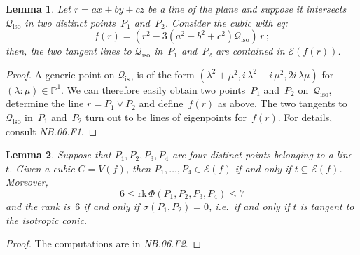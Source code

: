 \documentclass[a4paper, 11pt, reqno]{amsart}
\theoremstyle{plain}
\newtheorem{lemma}{Lemma}[section]
\theoremstyle{definition}
\newcommand{\p}{\mathbb{P}}
\newcommand{\nb}[2]{\textsl{{NB}.{#1}.{#2}}}
\newcommand{\iii}{\textit{i}\,}
\newcommand{\rk}{\ensuremath{\mathrm{rk}}}
\newcommand{\iso}{\mathcal{Q}_{\mathrm{iso}}}
\newcommand{\Eig}[1]{\mathcal{E}\!\left( {#1} \right)}
\begin{document}
\begin{lemma}
\label{lemma:twoTangentsCiso} Let $r = ax+by+cz$ be a line of the plane
and suppose it intersects $\iso$ in two
distinct points~$P_1$ and~$P_2$. Consider the cubic with eq:
\begin{equation}
\label{eq:2_lines_of_eigenpoints}
  f(r) = \left( r^2-3\left(a^2+b^2+c^2\right)\iso \right) \, r \,;
\end{equation}
then, the two tangent lines to $\iso$ in~$P_1$ and~$P_2$
are contained in $\Eig {f(r)}$.
\end{lemma}
\begin{proof}
A generic point on $\iso$ is of the form $(\lambda^2 + \mu^2,
\iii\lambda^2 -\iii\mu^2, 2\iii\lambda \mu)$ for $(\lambda: \mu) \in \p^1$.
We can therefore easily obtain two points~$P_1$ and~$P_2$ on~$\iso$,
determine the line $r = P_1 \vee P_2$ and define~$f(r)$ as above.
The two tangents to~$\iso$ in~$P_1$ and~$P_2$ turn out to be lines of eigenpoints
for~$f(r)$. For details, consult \nb{06}{F1}.
\end{proof}


\begin{lemma}
\label{lemma:four_points_on_line}
Suppose that $P_1, P_2, P_3, P_4$ are four distinct points belonging to a line~$t$.
Given a cubic $C=V(f)$, then $P_1, \dotsc, P_4 \in \Eig{f}$ if and only if
$t \subseteq \Eig{f}$.
Moreover,
%
\begin{equation*}
  6 \leq \rk \,\Phi(P_1, P_2, P_3, P_4) \leq 7
\end{equation*}
%
and the rank is~$6$ if and only if $\sigma(P_1, P_2) = 0$, i.e.\ if
and only if $t$ is tangent to the isotropic conic.
\end{lemma}
\begin{proof}
The computations are in \nb{06}{F2}.
\end{proof}
\end{document}
